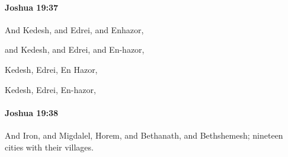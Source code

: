 		\paragraph{Joshua 19:37} %
			\label{JOSHUA-19-37}

			And Kedesh, and Edrei, and Enhazor,

			\begin{versebox}
					\item[BHS] 
					\item[ASV] and Kedesh, and Edrei, and En-hazor,
					\item[NIV] Kedesh, Edrei, En Hazor,
					\item[NRSV] Kedesh, Edrei, En-hazor,
			\end{versebox}

		\paragraph{Joshua 19:38} %
			\label{JOSHUA-19-38}

			And Iron, and Migdalel, Horem, and Bethanath, and Bethshemesh; nineteen cities with their villages.

